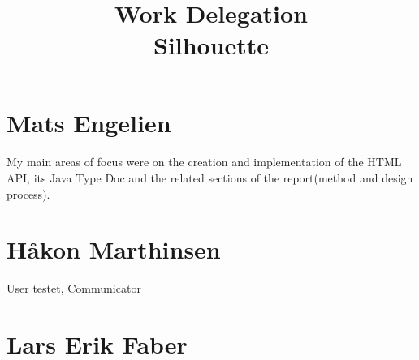 \documentclass[12pt]{article}
\begin{document}
\title{%
    Work Delegation\\
    \large Silhouette}
\date{}
\maketitle

\section{Mats Engelien}
    \paragraph{}
    My main areas of focus were on the creation and implementation of the HTML API, its Java Type Doc and the related sections of the report(method and design process).
    
\section{Håkon Marthinsen}
User testet, Communicator

\section{Lars Erik Faber}
\end{document}
